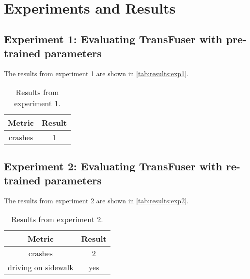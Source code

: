 \chapter{Experiments and Results}
\label{chap:results}


\section{Experiment 1: Evaluating TransFuser with pre-trained parameters}

The results from experiment 1 are shown in \autoref{tab:results:exp1}.

\begin{table}[]
    \centering
    \begin{tabular}{c|c}
        \textbf{Metric} & \textbf{Result} \\ \hline
        crashes & 1
    \end{tabular}
    \caption{Results from experiment 1.}
    \label{tab:results:exp1}
\end{table}


\section{Experiment 2: Evaluating TransFuser with re-trained parameters}

The results from experiment 2 are shown in \autoref{tab:results:exp2}.

\begin{table}[]
    \centering
    \begin{tabular}{c|c}
        \textbf{Metric} & \textbf{Result} \\ \hline
        crashes & 2 \\ \hline
        driving on sidewalk & yes
    \end{tabular}
    \caption{Results from experiment 2.}
    \label{tab:results:exp2}
\end{table}
